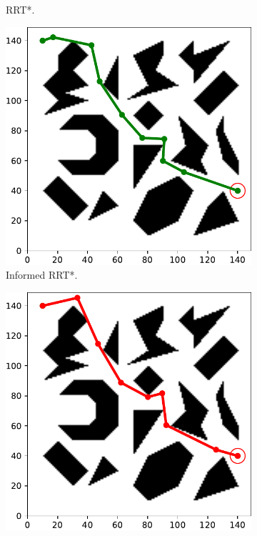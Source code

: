 \documentclass{ctuthesis}
\begin{document}
\begin{figure}[!ht]
\begin{subfigure}[b]{0.435\textwidth}
    \caption{RRT*.}
  \end{subfigure}     
  \begin{subfigure}[t]{0.264\textwidth}
    \includegraphics[width=\textwidth]{figChap5/Maze_clutter_first_solution_InformedRRTstar.pdf}  
    \caption{Informed RRT*.}
  \end{subfigure}  
  \begin{subfigure}[t]{0.264\textwidth}
    \includegraphics[width=\textwidth]{figChap5/Maze_clutter_first_solution_RRTsharp.pdf}  

\end{subfigure}
\end{figure}
\end{document}
